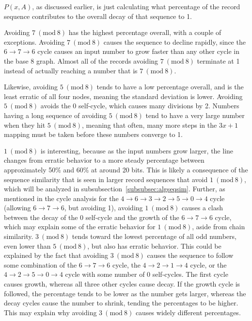 \documentclass[12pt]{article}
\newcommand{\Mod}[1]{\ (\mathrm{mod}\ #1)}
\theoremstyle{definition}
\begin{document}
$P(x,A)$, as discussed earlier, is just calculating what percentage of the record sequence contributes to the overall decay of that sequence to 1. \par
Avoiding $7 \Mod{8}$ has the highest percentage overall, with a couple of exceptions. Avoiding $7 \Mod{8}$ causes the sequence to decline rapidly, since the $6 \rightarrow 7 \rightarrow 6$ cycle causes an input number to grow faster than any other cycle in the base 8 graph. Almost all of the records avoiding $7 \Mod{8}$ terminate at 1 instead of actually reaching a number that is $7 \Mod{8}$. \par
Likewise, avoiding $5 \Mod{8}$ tends to have a low percentage overall, and is the least erratic of all four nodes, meaning the standard deviation is lower. Avoiding $5 \Mod{8}$ avoids the 0 self-cycle, which causes many divisions by 2. Numbers having a long sequence of avoiding $5 \Mod{8}$ tend to have a very large number when they hit $5 \Mod{8}$, meaning that often, many more steps in the $3x+1$ mapping must be taken before these numbers converge to 1. \par
$1 \Mod{8}$ is interesting, because as the input numbers grow larger, the line changes from erratic behavior to a more steady percentage between approximately 50\% and 60\% at around 20 bits. This is likely a consequence of the sequence similarity that is seen in larger record sequences that avoid $1 \Mod{8}$, which will be analyzed in subsubsection~\ref{subsubsec:algseqsim}. Further, as mentioned in the cycle analysis for the $4 \rightarrow 6 \rightarrow 3 \rightarrow 2 \rightarrow 5 \rightarrow 0 \rightarrow 4$ cycle (allowing $6 \rightarrow 7 \rightarrow 6$, but avoiding 1), avoiding $1\Mod{8}$ causes a clash between the decay of the 0 self-cycle and the growth of the $6 \rightarrow 7 \rightarrow 6$ cycle, which may explain some of the erratic behavior for $1\Mod{8}$, aside from chain similarity.
$3 \Mod{8}$ tends toward the lowest percentage of all odd numbers, even lower than $5 \Mod{8}$, but also has erratic behavior. This could be explained by the fact that avoiding $3 \Mod{8}$ causes the sequence to follow some combination of the $6 \rightarrow 7 \rightarrow 6$ cycle, the $4 \rightarrow 2 \rightarrow 1 \rightarrow 4$ cycle, or the $4 \rightarrow 2 \rightarrow 5 \rightarrow 0 \rightarrow 4$ cycle with some number of $0$ self-cycles. The first cycle causes growth, whereas all three other cycles cause decay. If the growth cycle is followed, the percentage tends to be lower as the number gets larger, whereas the decay cycles cause the number to shrink, tending the percentages to be higher. This may explain why avoiding $3 \Mod{8}$ causes widely different percentages.
\end{document}
